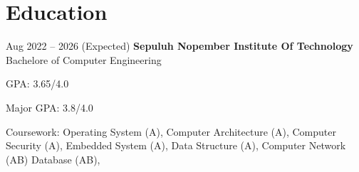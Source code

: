 \section{Education}

    \begin{twocolentry}{
        Aug 2022 – 2026 (Expected)
    }
    \textbf{Sepuluh Nopember Institute Of Technology}\\
    Bachelore of Computer Engineering\end{twocolentry}

    \vspace{0.10 cm}
    \begin{onecolentry}
        \begin{highlights}
            \item GPA: 3.65/4.0
            \item Major GPA: 3.8/4.0
            \item Coursework:
                Operating System (A),
                Computer Architecture (A),
                Computer Security (A),
                Embedded System (A),
                Data Structure (A),
                Computer Network (AB)
                Database (AB),
        \end{highlights}
    \end{onecolentry}
